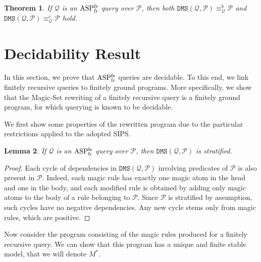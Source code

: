 \documentclass{tlp}
\newcommand{\p}{\ensuremath{{\mathcal{P}}}}
\newtheorem{theorem}{Theorem}[section]
\newtheorem{lemma}[theorem]{Lemma}
\newcommand{\Q}{\mathcal{Q}}
\newcommand{\qrelation}[3]{\ensuremath{{#1}_{#2}^{#3}}}
\newcommand{\qequiv}[2]{\ensuremath{\qrelation{\equiv}{#1}{#2}}}
\newcommand{\bqequiv}[1]{\ensuremath{\qequiv{#1}{b}}}
\newcommand{\cqequiv}[1]{\ensuremath{\qequiv{#1}{c}}}
\newcommand{\dmsqp}{\ensuremath{\DMS(\Q,\p)}}
\newcommand{\magica}{*}
\newcommand{\DMS}{\ensuremath{\mathtt{DMS}}}
\newcommand{\ASPFNFR}{\ensuremath{\rm ASP^{\rm fs}_{\rm fr}}}
\begin{document}
\begin{theorem}\label{thm:equivalence}
\label{theo:dms_equivalence}
If  $\Q$ is an \ASPFNFR{} query over $\p$, then both $\dmsqp \bqequiv{\Q}
\p$ and $\dmsqp \cqequiv{\Q} \p$ hold.
\end{theorem}


\section{Decidability Result}\label{sec:decidability}

In this section, we prove that \ASPFNFR{} queries are decidable.
To this end, we link finitely recursive queries to finitely ground programs.
More specifically, we show that the Magic-Set rewriting of a finitely recursive
query is a finitely ground program, for which querying is known to be decidable.

We first show some properties of the rewritten program due to the particular
restrictions applied to the adopted SIPS.

\begin{lemma}\label{lem:magicStratified}
If $\Q$ is an \ASPFNFR{} query over $\p$, 
then $\DMS(\Q,\p)$ is stratified.
\end{lemma}
\begin{proof}
Each cycle of
dependencies in $\dmsqp$ involving predicates of $\p$ is also present in
$\p$. Indeed, each magic rule has exactly one magic atom in the head and one
in the body, and each modified rule is obtained by adding 
only magic atoms to the body of a rule belonging to $\p$. 
Since $\p$ is stratified by assumption, such cycles have 
no negative dependencies.
Any new cycle stems only from magic rules, which are positive.
\end{proof}

Now consider the program consisting of the magic rules produced for 
a finitely recursive query. 
We can show that this program has a unique and finite stable model,
that we will denote $M^\magica$.
\end{document}
